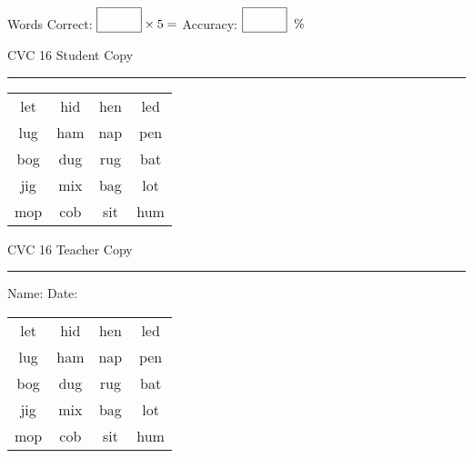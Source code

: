 \documentclass{memoir}
\begin{document}
\small

Words Correct: $\fbox{\phantom{\huge 100}} \times 5 = $ Accuracy: $\fbox{\phantom{\huge 100}}\;\; \%$ 

\vfill

\newpage


\footnotesize \noindent
CVC 16 \hfill Student Copy
\smallskip
\hrule

\Large

\setlength{\tabcolsep}{14pt}
\def\arraystretch{2}

{\selectfont


\begin{vplace}[0.5]
\begin{center}
\begin{tabular}{cccc}
let & hid & hen & led \\
lug & ham & nap & pen \\
bog & dug & rug & bat \\
jig & mix & bag & lot \\
mop & cob & sit & hum \\
\end{tabular}
\end{center}
\end{vplace}

}

\newpage

\footnotesize \noindent
CVC 16 \hfill Teacher Copy
\smallskip
\hrule

\small

\vfill

\noindent
Name: \underline{\hspace{1.75in}} \hfill Date: \underline{\hspace{1in}}

\Large

{\selectfont


\begin{vplace}[0.5]
\begin{center}
\begin{tabular}{cccc}
let & hid & hen & led \\
lug & ham & nap & pen \\
bog & dug & rug & bat \\
jig & mix & bag & lot \\
mop & cob & sit & hum \\
\end{tabular}
\end{center}
\end{vplace}



}
\end{document}
